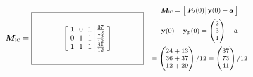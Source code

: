 \documentclass[12pt,letterpaper]{article}
\newcommand{\mat}[1]{\bm{#1}}
\newcommand{\KeyBox}[3]{%
  \vcenter{\hbox{$\boxed{\parbox[c][#2][c]{#1}{\centering\small
    \setlength{\arraycolsep}{3pt}\renewcommand{\arraystretch}{0.95}%
    \ensuremath{\displaystyle #3}}}$}}}
\newcommand{\KeySide}[2]{\quad\vcenter{\hbox{\parbox{#1}{\footnotesize\setlength{\arraycolsep}{2pt}\ensuremath{\begin{gathered}#2\end{gathered}}}}}}
\begin{document}
\begin{enumerate}
\begin{enumerate}
$\mat{M}_{\text{\textsc{ic}}}=\KeyBox{1.8in}{0.80in}{\left[\begin{array}{rrr|r}1&0&1&\frac{37}{12}\\0&1&1&\frac{73}{12}\\1&1&1&\frac{41}{12}\end{array}\right]}\KeySide{3.5in}{\mat{M}_{\text{\textsc{ic}}}=\left[\begin{array}{c|c}\mat{F}_2(0)&\vect{y}(0)-\vect{a}\end{array}\right]\\\vect{y}(0)-\vect{y}_p(0)=\begin{pmatrix}2\\3\\1\end{pmatrix}-\vect{a}\\=\begin{pmatrix}24+13\\36+37\\12+29\end{pmatrix}/12=\begin{pmatrix}37\\73\\41\end{pmatrix}/12}$
\end{enumerate}
\vfill

\end{enumerate}
\end{document}

